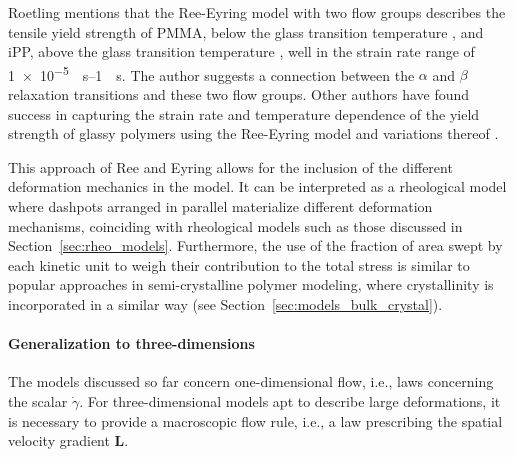 Roetling mentions that the Ree-Eyring model with two flow groups describes the tensile yield strength of PMMA, below the glass transition temperature \citep{roetlingYieldStressBehaviour1965}, and iPP, above the glass transition temperature \citep{roetlingYieldStressBehaviour1966}, well in the strain rate range of \SIrange{1e-5}{1}{\per\second}.
The author suggests a connection between the $\alpha$ and $\beta$ relaxation transitions and these two flow groups.
Other authors have found success in capturing the strain rate and temperature dependence of the yield strength of glassy polymers using the Ree-Eyring model and variations thereof \citep{bauwensTensileYieldstressBehavior1969, bauwensRelationCompressionYield1972, bauwens-crowetCompressionYieldBehaviour1973, haussyThermodynamicAnalysisPlastic1980}.

This approach of Ree and Eyring allows for the inclusion of the different deformation mechanics in the model.
It can be interpreted as a rheological model where dashpots arranged in parallel materialize different deformation mechanisms, coinciding with rheological models such as those discussed in Section~\ref{sec:rheo_models}.
Furthermore, the use of the fraction of area swept by each kinetic unit to weigh their contribution to the total stress is similar to popular approaches in semi-crystalline polymer modeling, where crystallinity is incorporated in a similar way (see Section~\ref{sec:models_bulk_crystal}).

\paragraph{Generalization to three-dimensions}
The models discussed so far concern one-dimensional flow, i.e., laws concerning the scalar $\dot \gamma$.
For three-dimensional models apt to describe large deformations, it is necessary to provide a macroscopic flow rule, i.e., a law prescribing the spatial velocity gradient $\mathbf L$.

